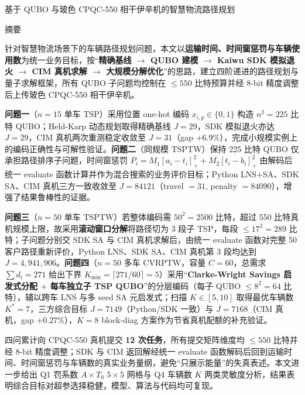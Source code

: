 \documentclass[UTF8,12pt,a4paper]{ctexart}
\begin{document}
\begin{center}
{\fontsize{16pt}{20pt}\selectfont
基于 QUBO 与玻色 CPQC-550 相干伊辛机的智慧物流路径规划}
\end{center}
\vspace{0.6em}

\begin{center}
{\fontsize{14pt}{18pt}\selectfont 摘\quad 要}
\end{center}
\vspace{0.4em}

针对智慧物流场景下的车辆路径规划问题，本文以\textbf{运输时间、时间窗惩罚与车辆使用数}为统一业务目标，按``\textbf{精确基线 $\rightarrow$ QUBO 建模 $\rightarrow$ Kaiwu SDK 模拟退火 $\rightarrow$ CIM 真机求解 $\rightarrow$ 大规模分解优化}''的思路，建立四阶递进的路径规划与量子求解框架，所有 QUBO 子问题均控制在 $\le 550$ 比特预算并经 8-bit 精度调整后上传玻色 CPQC-550 相干伊辛机。

\textbf{问题一}（$n=15$ 单车 TSP）采用位置 one-hot 编码 $x_{i,p}\!\in\!\{0,1\}$ 构造 $n^{2}=225$ 比特 QUBO；Held-Karp 动态规划取得精确基线 $J=29$，SDK 模拟退火亦达 $J=29$，CIM 真机两次重测稳定收敛至 $J=31$（gap $+6.9\%$），完成小规模实例上的编码正确性与可解性验证。\textbf{问题二}（同规模 TSPTW）保持 225 比特 QUBO 仅承担路径排序子问题，时间窗惩罚 $P_i=M_1[a_i\!-\!t_i]_+^2+M_2[t_i\!-\!b_i]_+^2$ 由解码后统一 evaluate 函数计算并作为混合搜索的业务评价目标；Python LNS$+$SA、SDK SA、CIM 真机三方一致收敛至 $J=84121$（travel $=31$, penalty $=84090$），增强了结果鲁棒性的证据。

\textbf{问题三}（$n=50$ 单车 TSPTW）若整体编码需 $50^{2}=2500$ 比特，超过 550 比特真机规模上限，故采用\textbf{滚动窗口分解}将路径切为 3 段子 TSP，每段 $\le 17^{2}=289$ 比特；子问题分别交 SDK SA 与 CIM 真机求解后，由统一 evaluate 函数对完整 50 客户路径重新评价，Python LNS、SDK SA、CIM 真机第 3 段均达到 $J=4{,}941{,}906$。\textbf{问题四}（$n=50$ 多车 CVRPTW，容量 $C=60$，总需求 $\sum d_i=271$ 给出下界 $K_{\min}=\lceil 271/60\rceil=5$）采用``\textbf{Clarke-Wright Savings 启发式分配 $+$ 每车独立子 TSP QUBO}''的分层编码（每子 QUBO $\le 8^{2}=64$ 比特），辅以跨车 LNS 与多 seed SA 元启发式；扫描 $K\!\in\![5,10]$ 取得最优车辆数 $K^{*}=7$，三方综合目标 $J=7149$（Python/SDK 一致）与 $J=7168$（CIM 真机，gap $+0.27\%$），$K=8$ block-diag 方案作为节省真机配额的补充验证。

四问累计向 CPQC-550 真机提交 \textbf{12 次任务}，所有提交矩阵维度均 $\le 550$ 比特并经 8-bit 精度调整；SDK 与 CIM 返回解经统一 evaluate 函数解码后回到运输时间、时间窗惩罚与车辆数的真实业务量纲，避免``只展示能量''的失真表述。本文进一步给出 Q1 罚系数 $A\!\times\!T_0$ $5\!\times\!5$ 网格与 Q4 车辆数 $K$ 两类灵敏度分析，结果表明综合目标对超参选择稳健，模型、算法与代码均可复现。
\end{document}
